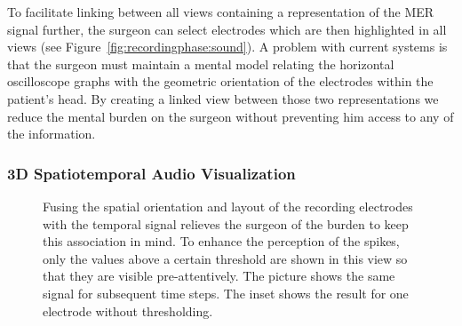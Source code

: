 \documentclass[review]{vgtc}                 %
\begin{document}
To facilitate linking between all views containing a representation of the MER signal further, the surgeon can select electrodes which are then highlighted in all views (see Figure~\ref{fig:recordingphase:sound}). A problem with current systems is that the surgeon must maintain a mental model relating the horizontal oscilloscope graphs with the geometric orientation of the electrodes within the patient's head. By creating a linked view between those two representations we reduce the mental burden on the surgeon without preventing him access to any of the information.

\subsubsection{3D Spatiotemporal Audio Visualization}\label{sec:overview:recording:3daudio}
\begin{figure}[t]
    \centering
    \caption{Fusing the spatial orientation and layout of the recording electrodes with the temporal signal relieves the surgeon of the burden to keep this association in mind. To enhance the perception of the spikes, only the values above a certain threshold are shown in this view so that they are visible pre-attentively. The picture shows the same signal for subsequent time steps. The inset shows the result for one electrode without thresholding.}
    \label{fig:recordingphase:3dsound}
\end{figure}
\end{document}

